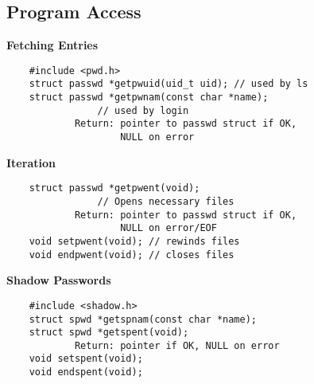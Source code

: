 \documentclass[10pt]{article}
\begin{document}
\begin{multicols}{2}
\begin{minipage}{\columnwidth}
\begin{flushright}
            \subsection*{Program Access}
            \textbf{Fetching Entries}
            \begin{lstlisting}
    #include <pwd.h>
    struct passwd *getpwuid(uid_t uid); // used by ls
    struct passwd *getpwnam(const char *name);
                // used by login
            Return: pointer to passwd struct if OK,
                    NULL on error
            \end{lstlisting}
            \textbf{Iteration}
            \begin{lstlisting}
    struct passwd *getpwent(void);
                // Opens necessary files
            Return: pointer to passwd struct if OK,
                    NULL on error/EOF
    void setpwent(void); // rewinds files
    void endpwent(void); // closes files
            \end{lstlisting}
            \textbf{Shadow Passwords}
            \begin{lstlisting}
    #include <shadow.h>
    struct spwd *getspnam(const char *name);
    struct spwd *getspent(void);
            Return: pointer if OK, NULL on error
    void setspent(void);
    void endspent(void);
            \end{lstlisting}
            \vspace*{-3em}

\end{flushright}
\end{minipage}
\end{multicols}
\end{document}
